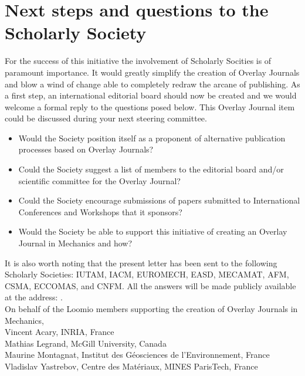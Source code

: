 \documentclass[11pt]{article}
\begin{document}
\section*{Next steps and questions to the Scholarly Society}
For the success of this initiative the involvement of Scholarly Socities is of paramount importance. It would greatly simplify the creation of Overlay Journals and blow a wind of change able to completely redraw the arcane of publishing. As a first step, an international editorial board should now be created and we would welcome a formal reply to the questions posed below. This Overlay Journal item could be discussed during your next steering committee.
\begin{itemize}
\item Would the Society position itself as a proponent of alternative publication processes based on Overlay Journals? 
\item Could the Society suggest a list of members to the editorial board and/or scientific committee for the Overlay Journal? 
\item Could the Society encourage submissions of papers submitted to International Conferences and Workshops that it sponsors? 
\item Would the Society be able to support this initiative of creating an Overlay Journal in Mechanics and how?
\end{itemize}
It is also worth noting that the present letter has been sent to the following Scholarly Societies: IUTAM, IACM, EUROMECH, EASD, MECAMAT, AFM, CSMA, ECCOMAS, and CNFM. All the answers will be made publicly available at the address: {\small{}}.\\[5pt]

On behalf of the Loomio members supporting the creation of Overlay Journals in Mechanics, \\[10pt]
Vincent Acary, INRIA, France\\
Mathias Legrand, McGill University, Canada\\
Maurine Montagnat, Institut des Géosciences de l'Environnement, France\\
Vladislav Yastrebov, Centre des Matériaux, MINES ParisTech, France
\end{document}
